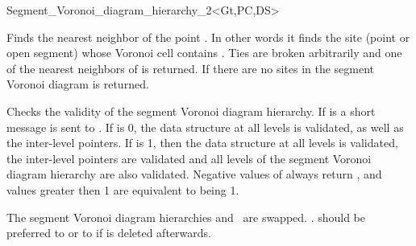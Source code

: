 \begin{ccRefClass}{Segment_Voronoi_diagram_hierarchy_2<Gt,PC,DS>}


%
{Finds the nearest neighbor of the point . In other words it
finds the site (point or open segment) whose Voronoi cell contains
. Ties are broken arbitrarily and one of the nearest neighbors
of  is returned. If there are no sites in the
segment Voronoi diagram  is returned.}
\ccGlue
{}



%
{Checks the validity of the segment Voronoi diagram hierarchy. If
 is  a short message is sent to
. If  is 0, the data structure at all levels 
is validated, as well as the inter-level pointers. If  is
1, then the data structure at all levels is validated, the inter-level
pointers are validated and all levels of the segment Voronoi diagram
hierarchy are also validated. Negative values of  always
return , and values greater then 1 are equivalent to
 being 1.}

%
\ccGlue
{The segment Voronoi diagram hierarchies  and \ccVar\ are
swapped. \ccVar. should be preferred to \ccVar{} or to \ccVar{} if  is deleted afterwards.}



\end{ccRefClass}

